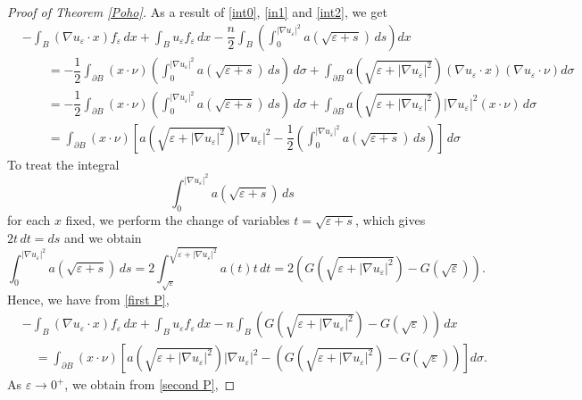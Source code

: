 \documentclass[leqno,twoside, 12pt]{amsart}
\theoremstyle{plain}
\numberwithin{equation}{section} \numberwithin{figure}{section}
\theoremstyle{definition}
\numberwithin{equation}{section}
\begin{document}
\begin{proof}[Proof of Theorem \ref{Poho}]
As a result of \eqref{int0}, \eqref{in1} and \eqref{int2}, we get
\begin{equation}\label{first P}
\begin{split}
&-\int_B (\nabla u_\varepsilon \cdot x)f_\varepsilon \,dx + \int_B u_\varepsilon f_\varepsilon\,dx  - \dfrac{n}{2}\int_B\left(\int_0^{|\nabla u_\varepsilon|^2}a(\sqrt{\varepsilon + s})\,ds \right)dx \\ & \qquad  = -\dfrac{1}{2}\int_{\partial B}(x\cdot \nu) \left(\int_0^{|\nabla u_\varepsilon|^2}a(\sqrt{\varepsilon + s})\,ds \right)\,d\sigma +\int_{\partial B}a(\sqrt{\varepsilon+|\nabla u_\varepsilon|^2})(\nabla u_{\varepsilon}\cdot x)(\nabla u_\varepsilon \cdot \nu)d\sigma \\ & \qquad = -\dfrac{1}{2}\int_{\partial B}(x\cdot \nu) \left(\int_0^{|\nabla u_\varepsilon|^2}a(\sqrt{\varepsilon + s})\,ds \right)\,d\sigma +\int_{\partial B}a(\sqrt{\varepsilon+|\nabla u_\varepsilon|^2})|\nabla u_\varepsilon|^2  ( x\cdot \nu)\,d\sigma \\ & \qquad =\int_{\partial B}(x\cdot \nu) \left[a(\sqrt{\varepsilon+|\nabla u_\varepsilon|^2})|\nabla u_\varepsilon|^2-\dfrac{1}{2} \left(\int_0^{|\nabla u_\varepsilon|^2}a(\sqrt{\varepsilon + s})\,ds \right)\right]\,d\sigma
\end{split}
\end{equation}To treat the integral
$$\int_0^{|\nabla u_\varepsilon|^2}a(\sqrt{\varepsilon + s})\,ds$$for each $x$ fixed, we perform the change of variables
$t=\sqrt{\varepsilon+s}$, which gives $2t\,dt= ds$ and we obtain
$$ \int_0^{|\nabla u_\varepsilon|^2}a(\sqrt{\varepsilon + s})\,ds= 2\int_{\sqrt{\varepsilon}}^{\sqrt{\varepsilon +|\nabla u_\varepsilon|^2}}a(t)t\,dt= 2 \left( G(\sqrt{\varepsilon +|\nabla u_\varepsilon|^2})-G(\sqrt{\varepsilon})\right).
$$
Hence, we have from \eqref{first P},
\begin{equation}\label{second P}
\begin{split}
&-\int_B (\nabla u_\varepsilon \cdot x)f_\varepsilon \,dx + \int_B u_\varepsilon f_\varepsilon\,dx-n\int_B\left( G(\sqrt{\varepsilon +|\nabla u_\varepsilon|^2})-G(\sqrt{\varepsilon})\right)\,dx \\ & \quad= \int_{\partial B}(x\cdot \nu) \left[a(\sqrt{\varepsilon+|\nabla u_\varepsilon|^2})|\nabla u_\varepsilon|^2-\left( G(\sqrt{\varepsilon +|\nabla u_\varepsilon|^2})-G(\sqrt{\varepsilon})\right)\right] d\sigma.
\end{split}
\end{equation}
As $\varepsilon\to 0^{+}$, we obtain from \eqref{second P},

\end{proof}
\end{document}
